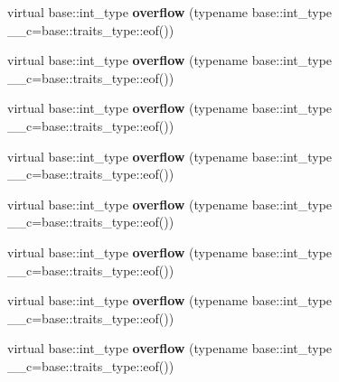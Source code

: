\begin{DoxyCompactItemize}
\item 
\mbox{\label{structtestbuf_a1d33d01e5a3f18a1fa4407c67eb87f52}} 
virtual base\+::int\+\_\+type {\bfseries overflow} (typename base\+::int\+\_\+type \+\_\+\+\_\+c=base\+::traits\+\_\+type\+::eof())
\item 
\mbox{\label{structtestbuf_a1d33d01e5a3f18a1fa4407c67eb87f52}} 
virtual base\+::int\+\_\+type {\bfseries overflow} (typename base\+::int\+\_\+type \+\_\+\+\_\+c=base\+::traits\+\_\+type\+::eof())
\item 
\mbox{\label{structtestbuf_a1d33d01e5a3f18a1fa4407c67eb87f52}} 
virtual base\+::int\+\_\+type {\bfseries overflow} (typename base\+::int\+\_\+type \+\_\+\+\_\+c=base\+::traits\+\_\+type\+::eof())
\item 
\mbox{\label{structtestbuf_a1d33d01e5a3f18a1fa4407c67eb87f52}} 
virtual base\+::int\+\_\+type {\bfseries overflow} (typename base\+::int\+\_\+type \+\_\+\+\_\+c=base\+::traits\+\_\+type\+::eof())
\item 
\mbox{\label{structtestbuf_a1d33d01e5a3f18a1fa4407c67eb87f52}} 
virtual base\+::int\+\_\+type {\bfseries overflow} (typename base\+::int\+\_\+type \+\_\+\+\_\+c=base\+::traits\+\_\+type\+::eof())
\item 
\mbox{\label{structtestbuf_a1d33d01e5a3f18a1fa4407c67eb87f52}} 
virtual base\+::int\+\_\+type {\bfseries overflow} (typename base\+::int\+\_\+type \+\_\+\+\_\+c=base\+::traits\+\_\+type\+::eof())
\item 
\mbox{\label{structtestbuf_a1d33d01e5a3f18a1fa4407c67eb87f52}} 
virtual base\+::int\+\_\+type {\bfseries overflow} (typename base\+::int\+\_\+type \+\_\+\+\_\+c=base\+::traits\+\_\+type\+::eof())
\item 
\mbox{\label{structtestbuf_a1d33d01e5a3f18a1fa4407c67eb87f52}} 
virtual base\+::int\+\_\+type {\bfseries overflow} (typename base\+::int\+\_\+type \+\_\+\+\_\+c=base\+::traits\+\_\+type\+::eof())
\item 
\mbox{\label{structtestbuf_a1d33d01e5a3f18a1fa4407c67eb87f52}} 

\end{DoxyCompactItemize}

